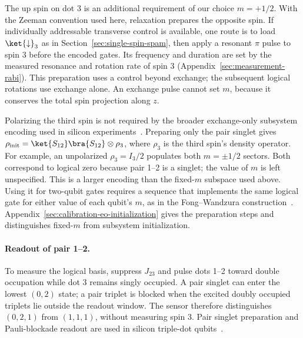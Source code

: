 The up spin on dot 3 is an additional requirement of our choice
$m=+1/2$. With the Zeeman convention used here, relaxation prepares
the opposite spin. If individually addressable transverse control
is available, one route is to load $\ket{\downarrow}_3$ as in
Section~\ref{sec:single-spin-spam}, then apply a resonant $\pi$ pulse
to spin 3 before the encoded gates. Its frequency and duration are
set by the measured resonance and rotation rate of spin 3
(Appendix~\ref{sec:measurement-rabi}). This preparation uses a control
beyond exchange; the subsequent logical rotations use exchange alone.
An exchange pulse cannot set $m$, because it conserves
the total spin projection along $z$.

Polarizing the third spin is not required by the broader
exchange-only subsystem encoding used in silicon
experiments~\cite{Weinstein2023}.
Preparing only the pair singlet gives
$\rho_{\mathrm{init}}=\ket{S_{12}}\bra{S_{12}}\otimes\rho_3$,
where $\rho_3$ is the third spin's density operator.
For example, an unpolarized $\rho_3=I_3/2$ populates both
$m=\pm1/2$ sectors. Both correspond to logical zero because pair
1--2 is a singlet; the value of $m$ is left unspecified.
This is a larger encoding than the fixed-$m$ subspace used above.
Using it for two-qubit gates requires a sequence that implements
the same logical gate for either value of each qubit's $m$, as in
the Fong--Wandzura construction~\cite{FongWandzura2011,Weinstein2023}.
Appendix~\ref{sec:calibration-eo-initialization} gives the preparation
steps and distinguishes fixed-$m$ from subsystem initialization.

\paragraph{Readout of pair 1--2.}
To measure the logical basis, suppress $J_{23}$ and pulse dots 1--2
toward double occupation while dot 3 remains singly occupied.
A pair singlet can enter the lowest $(0,2)$ state; a pair triplet
is blocked when the excited doubly occupied triplets lie outside
the readout window. The sensor therefore distinguishes $(0,2,1)$
from $(1,1,1)$, without measuring spin 3.
Pair singlet preparation and Pauli-blockade readout are used in
silicon triple-dot qubits~\cite{Blumoff2022}.

